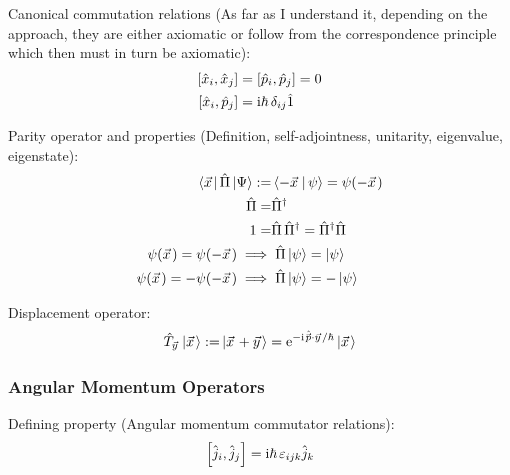 		\noindent
		Canonical commutation relations (As far as I understand it, depending on the approach, they are either axiomatic or follow from the correspondence principle which then must in turn be axiomatic):
		\begin{equation}
			\begin{aligned}
				\comm{\hat{x}_i}{\hat{x}_j } &= \comm{\hat{p}_i}{\hat{p}_j} = 0 \\
				\comm{\hat{x}_i}{\hat{p}_j } &= \i\hbar\, \delta_{ij}\hat{1} \\
			\end{aligned}
		\end{equation}

		\noindent
		Parity operator and properties (Definition, self-adjointness, unitarity, eigenvalue, eigenstate):
		\begin{equation}
			\begin{aligned}
				\Bra{\vec{x}} \hat{\Pi} \Ket{\Psi} :=& \Braket{-\vec{x} | \psi} = \psi(-\vec{x}) \\
				\hat{\Pi} =& \hat{\Pi}^\dagger\\
				1 =& \hat{\Pi} \,\hat{\Pi}^\dagger = \hat{\Pi}^\dagger \hat{\Pi} \\
				\psi(\vec{x}) = \psi(-\vec{x}) \implies&\; \hat{\Pi}\Ket{\psi} = \Ket{\psi} \\
				\psi(\vec{x}) = -\psi(-\vec{x}) \implies&\; \hat{\Pi}\Ket{\psi} = -\Ket{\psi} \\
			\end{aligned}
		\end{equation}

		\noindent
		Displacement operator:
		\begin{equation}
			\begin{aligned}
				\hat{T}_{\vec{y}}\Ket{\vec{x}} :=& \Ket{\vec{x} + \vec{y}} = \ex^{-\i\hat{\vec{p}}\cdot\vec{y}/\hbar}\Ket{\vec{x}} \\
			\end{aligned}
		\end{equation}

		\subsubsection{Angular Momentum Operators}
			\noindent
			Defining property (Angular momentum commutator relations):
			\begin{equation}
				\left[ \hat{j}_i, \hat{j}_j \right] = \mathrm{i}\hbar\, \varepsilon_{ijk} \hat{j}_k
			\end{equation}

